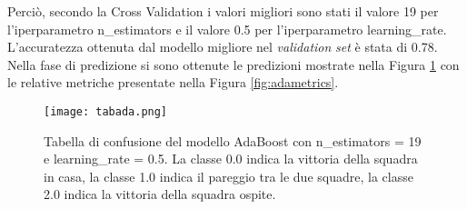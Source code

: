 Perciò, secondo la Cross Validation i valori migliori sono stati il valore 19 per l'iperparametro \textsf{n\_estimators} e il valore 0.5 per l'iperparametro \textsf{learning\_rate}. L'accuratezza ottenuta dal modello migliore nel \emph{validation} \emph{set} è stata di 0.78.\\
Nella fase di predizione si sono ottenute le predizioni mostrate nella Figura \ref{fig:tabada} con le relative metriche presentate nella Figura \ref{fig:adametrics}.
\begin{figure}[h]
	\begin{center}
		\texttt{[image: tabada.png]}
		\caption{Tabella di confusione del modello AdaBoost con \textsf{n\_estimators} = 19 e \textsf{learning\_rate} = 0.5. La classe 0.0 indica la vittoria della squadra in casa, la classe 1.0 indica il pareggio tra le due squadre, la classe 2.0 indica la vittoria della squadra ospite.
		} 
		\label{fig:tabada}
	\end{center}
\end{figure}

